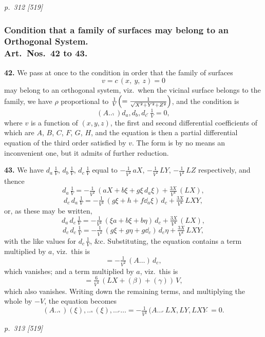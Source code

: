 \documentclass[11pt,a4paper]{book}
\begin{document}
\clearpage

\bigskip
\textit{p.~312 [519]}
\smallskip

\subsubsection*{Condition that a family of surfaces may belong to an Orthogonal System.\\
Art.\ Nos.~42 to 43.}

\textbf{42.} We pass at once to the condition in order that the family of surfaces
\[
v = c\,(x,\ y,\ z) = 0
\]
may belong to an orthogonal system, viz.\ when the vicinal surface belongs to the family, we have $\rho$ proportional to $\tfrac{1}{V}\Bigl(=\tfrac{1}{\sqrt{X^2 + Y^2 + Z^2}}\Bigr)$, and the condition is
\[
(A\ldots\check{}\,)d_{a}, d_{b}, d_{c}\,\check{}\,\tfrac{1}{V} = 0,
\]
where $v$ is a function of $(x, y, z)$, the first and second differential coefficients of which are $A$, $B$, $C$, $F$, $G$, $H$, and the equation is then a partial differential equation of the third order satisfied by $v$. The form is by no means an inconvenient one, but it admits of further reduction.

\textbf{43.} We have $d_{a}\,\tfrac{1}{V}$, $d_{b}\,\tfrac{1}{V}$, $d_{c}\,\tfrac{1}{V}$ equal to $-\tfrac{1}{V^2}\,a X$, $-\tfrac{1}{V^2}\,LY$, $-\tfrac{1}{V^2}\,LZ$ respectively, and thence
\[
d_{a}\,\tfrac{1}{V} = -\tfrac{1}{V^2}\,(aX + b\xi + g\xi\,d_{a}\xi) + \tfrac{3 X}{V^4}\,(LX),
\]
\[
d_{c}\,d_{a}\,\tfrac{1}{V} = -\tfrac{1}{V^2}\,(g\xi + h + f\dd_{a}\xi)\,d_{c} + \tfrac{3 X}{V^4}\,LXY,
\]
or, as these may be written,
\[
d_{a}\,d_{c}\,\tfrac{1}{V} = -\tfrac{1}{V^2}\,(\xi a + b\xi + b\eta)\,d_{c} + \tfrac{3 X}{V^4}\,(LX),
\]
\[
d_{c}\,d_{c}\,\tfrac{1}{V} = -\tfrac{1}{V^2}\,(g\xi + g\eta + g\dd_{c})\,d_{c}\eta + \tfrac{3 X}{V^4}\,LXY,
\]
with the like values for $d_{c}\,\tfrac{1}{V}$, \&c. Substituting, the equation contains a term multiplied by $a$, viz.\ this is
\[
= -\tfrac{1}{V^2}\,(A\ldots)\,d_{c},
\]
which vanishes; and a term multiplied by $a$, viz.\ this is
\[
= \tfrac{6}{V^4}\,(LX + (\beta) + (\gamma))\,V,
\]
which also vanishes. Writing down the remaining terms, and multiplying the whole by $-V$, the equation becomes
\[
(A\ldots\check{}\,)(\xi),\ldots\check{}\,(\xi),\ldots\,\check{}\ldots = -\tfrac{1}{V^2}\,(A\ldots\,\check{}\,LX, LY, LXY\,\check{}\,= 0.
\]

\clearpage

\bigskip
\textit{p.~313 [519]}
\smallskip
\end{document}

